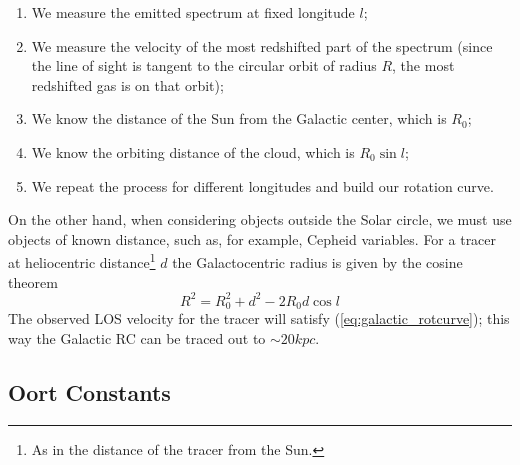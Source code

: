 \begin{enumerate}
    \item We measure the emitted spectrum at fixed longitude $l$;
    \item We measure the velocity of the most redshifted part of the spectrum (since the line of sight is tangent to the circular orbit of radius $R$, the most redshifted gas is on that orbit);
    \item We know the distance of the Sun from the Galactic center, which is $R_{0}$;
    \item We know the orbiting distance of the cloud, which is $R_{0}\sin l$;
    \item We repeat the process for different longitudes and build our rotation curve.
\end{enumerate}
On the other hand, when considering objects outside the Solar circle, we must use objects of known distance, such as, for example, Cepheid variables. For a tracer at heliocentric distance\footnote{As in the distance of the tracer from the Sun.} $d$ the Galactocentric radius is given by the cosine theorem
\begin{equation*}
    R^{2} = R_{0}^{2}+d^{2}-2R_{0}d\cos l
\end{equation*}
The observed LOS velocity for the tracer will satisfy (\ref{eq:galactic_rotcurve}); this way the Galactic RC can be traced out to $\sim 20\unit{kpc}$.

\subsection{Oort Constants}

